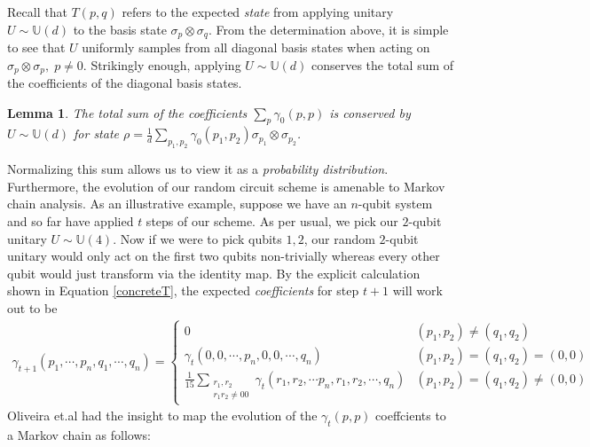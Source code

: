 \documentclass[12pt]{amsart}
\newtheorem{lemma}[theorem]{Lemma}
\theoremstyle{definition}
\theoremstyle{remark}
\numberwithin{equation}{section}
\theoremstyle{remark}
\begin{document}
%
Recall that $T(p,q)$ refers to the expected \emph{state} from applying unitary $U \sim \mathbb{U}(d)$ to the basis state $\sigma_p \otimes \sigma_q$. From the determination above, it is simple to see that $U$ uniformly samples from all diagonal basis states when acting on $\sigma_p \otimes \sigma_p, \; p \neq 0$. Strikingly enough, applying $U \sim \mathbb{U}(d)$ conserves the total sum of the coefficients of the diagonal basis states.
%
\begin{lemma}
  The total sum of the coefficients $\sum_{p} \gamma_0(p,p)$ is conserved by $U \sim \mathbb{U}(d)$ for state $\rho = \frac{1}{d}\sum_{p_1,p_2} \gamma_0(p_1,p_2) \sigma_{p_1} \otimes \sigma_{p_2}$.
\end{lemma}
%
Normalizing this sum allows us to view it as a \emph{probability distribution}. Furthermore, the evolution of our random circuit scheme is amenable to Markov chain analysis. As an illustrative example, suppose we have an $n$-qubit system and so far have applied $t$ steps of our scheme. As per usual, we pick our $2$-qubit unitary $U \sim \mathbb{U}(4)$. Now if we were to pick qubits $1,2$, our random $2$-qubit unitary would only act on the first two qubits non-trivially whereas every other qubit would just transform via the identity map. By the explicit calculation shown in Equation \ref{concreteT}, the expected \emph{coefficients} for step $t+1$ will work out to be
%
\begin{align} \label{evolexample}
    \gamma_{t+1}(p_1,\cdots,p_n,q_1,\cdots,q_n) = \begin{cases}
       0 & (p_1 ,p_2) \neq (q_1, q_2) \\
       \gamma_t(0,0,\cdots, p_n, 0,0,\cdots,q_n ) & (p_1,p_2) = (q_1, q_2) = (0,0) \\
       \frac{1}{15}\sum_{\substack{r_1,r_2 \\ r_1r_2 \neq 00}} \gamma_t(r_1,r_2,\cdots p_n,r_1,r_2,\cdots,q_n) & (p_1,p_2) = (q_1,q_2) \neq (0,0)
    \end{cases}
\end{align}
 Oliveira et.al \cite{oliveira} had the insight to map the evolution of the $\gamma_t(p,p)$ coeffcients to a Markov chain as follows:
%
\end{document}
